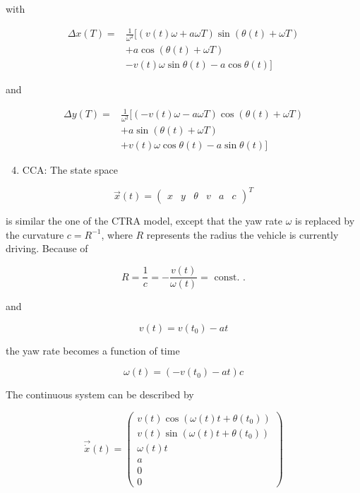 with

$$
\begin{aligned}
	\Delta x(T)= & \frac{1}{\omega^{2}}[(v(t) \omega+a \omega T) \sin (\theta(t)+\omega T) \\
	& +a \cos (\theta(t)+\omega T) \\
	& -v(t) \omega \sin \theta(t)-a \cos \theta(t)]
\end{aligned}
$$

and

$$
\begin{aligned}
	\Delta y(T)= & \frac{1}{\omega^{2}}[(-v(t) \omega-a \omega T) \cos (\theta(t)+\omega T) \\
	& +a \sin (\theta(t)+\omega T) \\
	& +v(t) \omega \cos \theta(t)-a \sin \theta(t)]
\end{aligned}
$$

\begin{enumerate}
	\setcounter{enumi}{3}
	\item CCA: The state space
\end{enumerate}

$$
\vec{x}(t)=\left(\begin{array}{cccccc}
	x & y & \theta & v & a & c
\end{array}\right)^{T}
$$

is similar the one of the CTRA model, except that the yaw rate $\omega$ is replaced by the curvature $c=R^{-1}$, where $R$ represents the radius the vehicle is currently driving. Because of

$$
R=\frac{1}{c}=-\frac{v(t)}{\omega(t)}=\text { const. } .
$$

and

$$
v(t)=v\left(t_{0}\right)-a t
$$

the yaw rate becomes a function of time

$$
\omega(t)=\left(-v\left(t_{0}\right)-a t\right) c
$$

The continuous system can be described by

$$
\overrightarrow{\dot{x}}(t)=\left(\begin{array}{c}
	v(t) \cos \left(\omega(t) t+\theta\left(t_{0}\right)\right) \\
	v(t) \sin \left(\omega(t) t+\theta\left(t_{0}\right)\right) \\
	\omega(t) t \\
	a \\
	0 \\
	0
\end{array}\right)
$$

